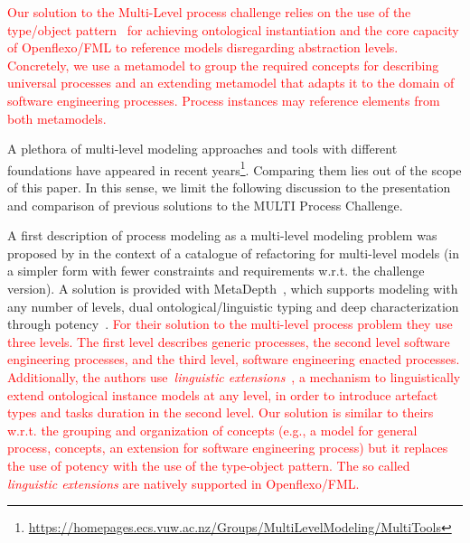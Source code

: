 

\textcolor{red}{Our solution to the Multi-Level process challenge relies on the use of the type/object pattern~\citep{typeObject} for achieving ontological instantiation and the core capacity of Openflexo/FML to reference models disregarding abstraction levels. Concretely, we use a metamodel to group the required concepts for describing universal processes and an extending metamodel that adapts it to the domain of software engineering processes. Process instances may reference elements from both metamodels.}

A plethora of multi-level modeling approaches and tools with different foundations have appeared in recent years\footnote{\url{https://homepages.ecs.vuw.ac.nz/Groups/MultiLevelModeling/MultiTools}}. Comparing them lies out of the scope of this paper. In this sense, we limit the following discussion to the presentation and comparison of previous solutions to the MULTI Process Challenge.

A first description of process modeling as a multi-level modeling problem was proposed by \parencite{lara2018refactoring} in the context of a catalogue of refactoring for multi-level models (in a simpler form with fewer constraints and requirements w.r.t. the challenge version). A solution is provided with MetaDepth~\parencite{metadepth}, which supports modeling with any number of levels, dual ontological/linguistic typing and deep characterization through potency~\citep{potency}. \textcolor{red}{For their solution to the multi-level process problem they use three levels. The first level describes generic processes, the second level software engineering processes, and the third level, software engineering enacted processes. Additionally, the authors use~\emph{linguistic extensions}~\citep{metadepth}, a mechanism to  linguistically extend ontological instance models at any level, in order to introduce artefact types and tasks duration in the second level. Our solution is similar to theirs w.r.t. the grouping and organization of concepts (e.g., a model for general process, concepts, an extension for software engineering process) but it replaces the use of potency with the use of the type-object pattern. The so called \emph{linguistic extensions} are natively supported in Openflexo/FML.}

